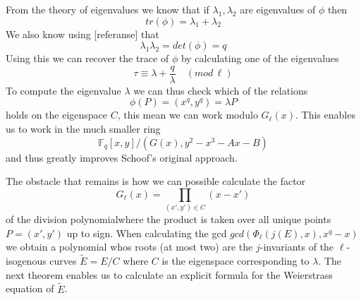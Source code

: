From the theory of eigenvalues we know that if $\lambda_1, \lambda_2$ are
eigenvalues of $\phi$ then $$tr(\phi) = \lambda_1 + \lambda_2$$
We also know using [referanse] that $$\lambda_1 \lambda_2 = det(\phi) = q $$
Using this we can recover the trace of $\phi$ by calculating one of the eigenvalues
$$ \tau \equiv \lambda + \frac{q}{\lambda} \quad (mod\, \ell) $$
To compute the eigenvalue $\lambda$ we can thus check which of the relations
$$ \phi(P) = (x^q, y^q) = \lambda P$$
holds on the eigenspace $C$, this mean we can work modulo $G_\ell(x)$. This enables us
to work in the much smaller ring $$\mathbb{F}_q[x,y]/(G(x), y^2 - x^3 - Ax - B) $$
and thus greatly improves Schoof's original approach.

The obstacle that remains is how we can possible calculate the factor 
$$ G_\ell(x) = \prod_{(x',y')\in C} (x-x')$$
of the division polynomialwhere the product is taken over all 
unique points $P = (x', y')$ up to sign. When calculating the gcd
$gcd(\Phi_\ell(j(E), x), x^q - x)$ we obtain a polynomial whos roots
(at most two) are the $j$-invariants of the $\ell$-isogenous curves
$\tilde{E} = E/C$ where $C$ is the eigenspace corresponding to $\lambda$.
The next theorem enables us to calculate an explicit formula for the Weierstrass
equation of $\tilde{E}$.

